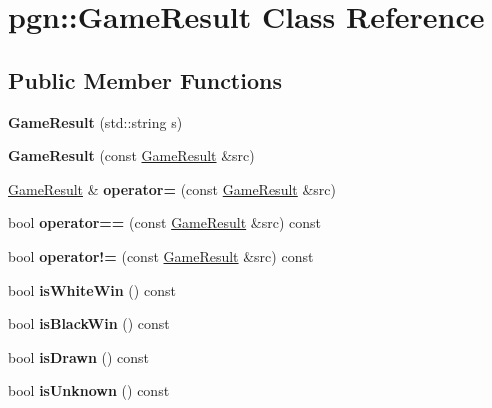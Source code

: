 \hypertarget{classpgn_1_1GameResult}{
\section{pgn::GameResult Class Reference}
\label{classpgn_1_1GameResult}
}
\subsection*{Public Member Functions}
\begin{DoxyCompactItemize}
\item 
\hypertarget{classpgn_1_1GameResult_a4d0cb12a719e7d7c493c9c0e33bbcec4}{
{\bfseries GameResult} (std::string s)}
\label{classpgn_1_1GameResult_a4d0cb12a719e7d7c493c9c0e33bbcec4}

\item 
\hypertarget{classpgn_1_1GameResult_a54ad0cf0520a188b2e50585684090cf3}{
{\bfseries GameResult} (const \hyperlink{classpgn_1_1GameResult}{GameResult} \&src)}
\label{classpgn_1_1GameResult_a54ad0cf0520a188b2e50585684090cf3}

\item 
\hypertarget{classpgn_1_1GameResult_aec873f6850ce41749fa843663be9a621}{
\hyperlink{classpgn_1_1GameResult}{GameResult} \& {\bfseries operator=} (const \hyperlink{classpgn_1_1GameResult}{GameResult} \&src)}
\label{classpgn_1_1GameResult_aec873f6850ce41749fa843663be9a621}

\item 
\hypertarget{classpgn_1_1GameResult_a16b63d46d350921fd82b347fd672cf2d}{
bool {\bfseries operator==} (const \hyperlink{classpgn_1_1GameResult}{GameResult} \&src) const }
\label{classpgn_1_1GameResult_a16b63d46d350921fd82b347fd672cf2d}

\item 
\hypertarget{classpgn_1_1GameResult_a59726e2f76eb4f2dac8689c9a8e755dd}{
bool {\bfseries operator!=} (const \hyperlink{classpgn_1_1GameResult}{GameResult} \&src) const }
\label{classpgn_1_1GameResult_a59726e2f76eb4f2dac8689c9a8e755dd}

\item 
\hypertarget{classpgn_1_1GameResult_a9f31f5bbb4edb633f5ffed005ac4da40}{
bool {\bfseries isWhiteWin} () const }
\label{classpgn_1_1GameResult_a9f31f5bbb4edb633f5ffed005ac4da40}

\item 
\hypertarget{classpgn_1_1GameResult_a3fa942ec8c3161a6f1ec7dd2640dcd91}{
bool {\bfseries isBlackWin} () const }
\label{classpgn_1_1GameResult_a3fa942ec8c3161a6f1ec7dd2640dcd91}

\item 
\hypertarget{classpgn_1_1GameResult_a61e5ec5c487399e405a6b1e0cfcf7fef}{
bool {\bfseries isDrawn} () const }
\label{classpgn_1_1GameResult_a61e5ec5c487399e405a6b1e0cfcf7fef}

\item 
\hypertarget{classpgn_1_1GameResult_a8677f97201226a09cca6c0bedf7f8777}{
bool {\bfseries isUnknown} () const }
\label{classpgn_1_1GameResult_a8677f97201226a09cca6c0bedf7f8777}

\end{DoxyCompactItemize}
